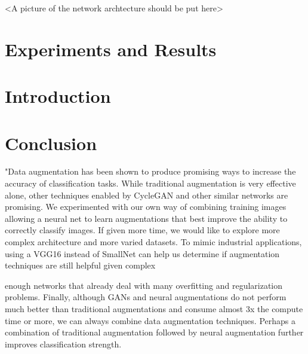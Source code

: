 \documentclass[a4paper,11pt]{article}
\begin{document}
<A picture of the network archtecture  should be put here>

\section{Experiments and Results}
\section{Introduction}
\section{Conclusion}
"Data augmentation has been shown to produce promising ways to increase the accuracy of classiﬁcation tasks. While traditional augmentation is very effective alone, other techniques enabled by CycleGAN and other similar networks are promising. We experimented with our own way of combining training images allowing a neural net to learn augmentations that best improve the ability to correctly classify images. If given more time, we would like to explore more complex architecture and more varied datasets. To mimic industrial applications, using a VGG16 instead of SmallNet can help us determine if augmentation techniques are still helpful given complex

enough networks that already deal with many overﬁtting and regularization problems. Finally, although GANs and neural augmentations do not perform much better than traditional augmentations and consume almost 3x the compute time or more, we can always combine data augmentation techniques. Perhaps a combination of traditional augmentation followed by neural augmentation further improves classification strength.



\end{document}
